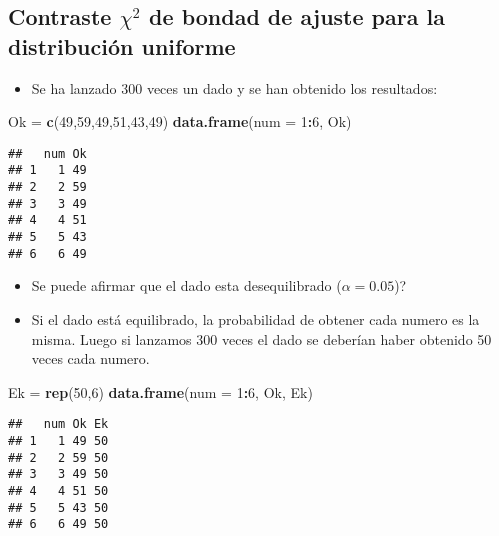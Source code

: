 \documentclass[]{article}
\newenvironment{Shaded}{\begin{snugshade}}{\end{snugshade}}
\newcommand{\KeywordTok}[1]{\textcolor[rgb]{0.13,0.29,0.53}{\textbf{#1}}}
\newcommand{\DataTypeTok}[1]{\textcolor[rgb]{0.13,0.29,0.53}{#1}}
\newcommand{\DecValTok}[1]{\textcolor[rgb]{0.00,0.00,0.81}{#1}}
\newcommand{\StringTok}[1]{\textcolor[rgb]{0.31,0.60,0.02}{#1}}
\newcommand{\OperatorTok}[1]{\textcolor[rgb]{0.81,0.36,0.00}{\textbf{#1}}}
\newcommand{\NormalTok}[1]{#1}
\providecommand{\tightlist}{%
  \setlength{\itemsep}{0pt}\setlength{\parskip}{0pt}}
\begin{document}
\subsection{\texorpdfstring{Contraste \(\chi^2\) de bondad de ajuste
para la distribución
uniforme}{Contraste \textbackslash{}chi\^{}2 de bondad de ajuste para la distribución uniforme}}\label{contraste-chi2-de-bondad-de-ajuste-para-la-distribucion-uniforme}

\begin{itemize}
\tightlist
\item
  Se ha lanzado 300 veces un dado y se han obtenido los resultados:
\end{itemize}

\begin{Shaded}
\begin{Highlighting}[]
\NormalTok{Ok =}\StringTok{ }\KeywordTok{c}\NormalTok{(}\DecValTok{49}\NormalTok{,}\DecValTok{59}\NormalTok{,}\DecValTok{49}\NormalTok{,}\DecValTok{51}\NormalTok{,}\DecValTok{43}\NormalTok{,}\DecValTok{49}\NormalTok{)}
\KeywordTok{data.frame}\NormalTok{(}\DataTypeTok{num =} \DecValTok{1}\OperatorTok{:}\DecValTok{6}\NormalTok{, Ok)}
\end{Highlighting}
\end{Shaded}

\begin{verbatim}
##   num Ok
## 1   1 49
## 2   2 59
## 3   3 49
## 4   4 51
## 5   5 43
## 6   6 49
\end{verbatim}

\begin{itemize}
\tightlist
\item
  Se puede afirmar que el dado esta desequilibrado (\(\alpha=0.05\))?
\item
  Si el dado está equilibrado, la probabilidad de obtener cada numero es
  la misma. Luego si lanzamos 300 veces el dado se deberían haber
  obtenido 50 veces cada numero.
\end{itemize}

\begin{Shaded}
\begin{Highlighting}[]
\NormalTok{Ek =}\StringTok{ }\KeywordTok{rep}\NormalTok{(}\DecValTok{50}\NormalTok{,}\DecValTok{6}\NormalTok{)}
\KeywordTok{data.frame}\NormalTok{(}\DataTypeTok{num =} \DecValTok{1}\OperatorTok{:}\DecValTok{6}\NormalTok{, Ok, Ek)}
\end{Highlighting}
\end{Shaded}

\begin{verbatim}
##   num Ok Ek
## 1   1 49 50
## 2   2 59 50
## 3   3 49 50
## 4   4 51 50
## 5   5 43 50
## 6   6 49 50
\end{verbatim}
\end{document}
